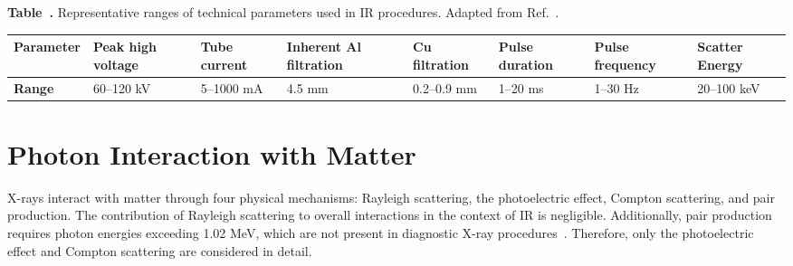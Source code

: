 \label{tab:ir_parameters}
\noindent\textbf{Table~\thetable.} Representative ranges of technical parameters used in IR procedures. Adapted from Ref.~\cite{20}.%

\vspace{0.1em}

\begin{table}[H]
  \centering
  \begin{tabular}{>{\raggedright\arraybackslash}p{}
                  >{\centering\arraybackslash}p{}
                  >{\centering\arraybackslash}p{}
                  >{\centering\arraybackslash}p{}
                  >{\centering\arraybackslash}p{}
                  >{\centering\arraybackslash}p{}
                  >{\centering\arraybackslash}p{}
                  >{\centering\arraybackslash}p{}}

    \toprule
\scriptsize \textbf{Parame\-ter} & \scriptsize \textbf{Peak high voltage} & \scriptsize \textbf{Tube current} & \scriptsize \textbf{Inherent Al filtration} & \scriptsize \textbf{Cu filtration} & \scriptsize \textbf{Pulse duration} & \scriptsize \textbf{Pulse frequency} & \scriptsize \textbf{Scatter Energy} \\

    \midrule
    \scriptsize \textbf{Range}
& \scriptsize 60–120 kV
& \scriptsize 5–1000 mA
& \scriptsize 4.5 mm
& \scriptsize 0.2–0.9 mm
& \scriptsize 1–20 ms
& \scriptsize 1–30 Hz
& \scriptsize 20–100 keV \\
    \bottomrule
  \end{tabular}
\end{table}

 \section{Photon Interaction with Matter}
 \label{sec:Photon Interaction with Matter}
X-rays interact with matter through four physical mechanisms: Rayleigh scattering, the photoelectric effect, Compton scattering, and pair production. The contribution of Rayleigh scattering to overall interactions in the context of IR is negligible. Additionally, pair production requires photon energies exceeding 1.02 MeV, which
are not present in diagnostic X-ray procedures~\cite{6}. Therefore, only the photoelectric effect and Compton scattering are considered in detail.

